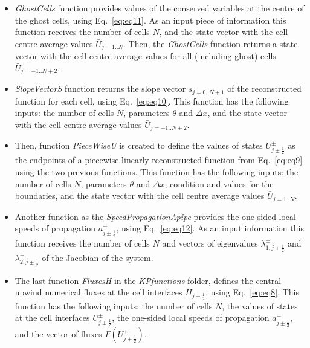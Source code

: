 \documentclass[%
]{USN-PhD}
\begin{document}
\begin{itemize}
\item \emph{GhostCells} function provides values of the conserved variables at the centre of the ghost cells, using Eq.~\ref{eq:eq11}. As an input piece of information this function receives the number of cells $N$, and the state vector with the cell centre average values $\bar{U}_{j=1..N}$. Then, the \emph{GhostCells} function returns a state vector with the cell centre average values for all (including ghost) cells $\bar{U}_{j=-1..N+2}$.
\item \emph{SlopeVectorS} function returns the slope vector $s_{j=0..N+1}$ of the reconstructed function for each cell, using Eq.~\ref{eq:eq10}. This function has the following inputs: the number of cells $N$, parameters $\theta$ and $\Delta x$, and the state vector with the cell centre average values $\bar{U}_{j=-1..N+2}$.
\item Then, function \emph{PieceWiseU} is created to define the values of states $U^\pm_{j\pm\frac{1}{2}}$ as the endpoints of a piecewise linearly reconstructed function from Eq.~\ref{eq:eq9} using the two previous functions. This function has the following inputs: the number of cells $N$, parameters $\theta$ and $\Delta x$, condition and values for the boundaries, and the state vector with the cell centre average values $\bar{U}_{j=1..N}$.
\item Another function as the \emph{SpeedPropagationApipe} provides the one-sided local speeds of propagation $a^\pm_{j\pm\frac{1}{2}}$, using Eq.~\ref{eq:eq12}. As an input information this function receives the number of cells $N$ and vectors of eigenvalues $\lambda^\pm_{1,j\pm\frac{1}{2}}$ and $\lambda^\pm_{2,j\pm\frac{1}{2}}$ of the Jacobian of the system.
\item The last function \emph{FluxesH} in the \emph{KPfunctions} folder, defines the central upwind numerical fluxes at the cell interfaces  $H_{j\pm\frac{1}{2}}$, using Eq.~\ref{eq:eq8}. This function has the following inputs: the number of cells $N$, the values of states at the cell interfaces $U^\pm_{j\pm\frac{1}{2}}$, the one-sided local speeds of propagation $a^\pm_{j\pm\frac{1}{2}}$, and the vector of fluxes $F\left(U^\pm_{j\pm\frac{1}{2}}\right)$.
\end{itemize}
\end{document}
